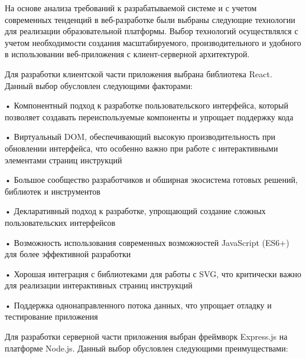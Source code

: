\subtitlespace

{\gostFont

  \par \redline На основе анализа требований к разрабатываемой системе и с учетом современных тенденций в веб-разработке были выбраны следующие технологии для реализации образовательной платформы. Выбор технологий осуществлялся с учетом необходимости создания масштабируемого, производительного и удобного в использовании веб-приложе\-ния с клиент-серверной архитектурой.

  \par \redline Для разработки клиентской части приложения выбрана библиотека React. Данный выбор обусловлен следующими факторами:
  
  \par \redline • Компонентный подход к разработке пользовательского интерфейса, который позволяет создавать переиспользуемые компоненты и упрощает поддержку кода
  \par \redline • Виртуальный DOM, обеспечивающий высокую производительность при обновлении интерфейса, что особенно важно при работе с интерактивными элементами страниц инструкций
  \par \redline • Большое сообщество разработчиков и обширная экосистема готовых решений, библиотек и инструментов
  \par \redline • Декларативный подход к разработке, упрощающий создание сложных пользовательских интерфейсов
  \par \redline • Возможность использования современных возможностей JavaScript (ES6+) для более эффективной разработки
  \par \redline • Хорошая интеграция с библиотеками для работы с SVG, что критически важно для реализации интерактивных страниц инструкций
  \par \redline • Поддержка однонаправленного потока данных, что упрощает отладку и тестирование приложения

  \par \redline Для разработки серверной части приложения выбран фреймворк Express.js на платформе Node.js. Данный выбор обусловлен следующими преимуществами:
  
}

